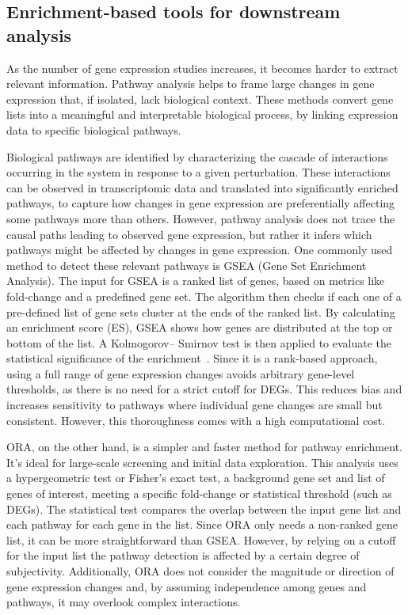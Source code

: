 \subsection{Enrichment-based tools for downstream analysis} %
\label{sub:enrichment_based_tools}

As the number of gene expression studies increases, it becomes harder to extract relevant information. Pathway analysis helps to frame large changes in gene expression that, if isolated, lack biological context. These methods convert gene lists into a meaningful and interpretable biological process, by linking expression data to specific biological pathways.

Biological pathways are identified by characterizing the cascade of interactions occurring in the system in response to a given perturbation. These interactions can be observed in transcriptomic data and translated into significantly enriched pathways, to capture how changes in gene expression are preferentially affecting some pathways more than others. However, pathway analysis does not trace the causal paths leading to observed gene expression, but rather it infers which pathways might be affected by changes in gene expression. One commonly used method to detect these relevant pathways is GSEA (Gene Set Enrichment Analysis). The input for GSEA is a ranked list of genes, based on metrics like fold-change and a predefined gene set. The algorithm then checks if each one of a pre-defined list of gene sets cluster at the ends of the ranked list. By calculating an enrichment score (ES), GSEA shows how genes are distributed at the top or bottom of the list. A Kolmogorov– Smirnov test is then applied to evaluate the statistical significance of the enrichment~\cite{RN152}. Since it is a rank-based approach, using a full range of gene expression changes avoids arbitrary gene-level thresholds, as there is no need for a strict cutoff for DEGs. This reduces bias and increases sensitivity to pathways where individual gene changes are small but consistent. However, this thoroughness comes with a high computational cost. 

\gls{ORA}, on the other hand, is a simpler and faster method for pathway enrichment. It's ideal for large-scale screening and initial data exploration. This analysis uses a hypergeometric test or Fisher's exact test, a background gene set and list of genes of interest, meeting a specific fold-change or statistical threshold (such as DEGs). The statistical test compares the overlap between the input gene list and each pathway for each gene in the list. Since ORA only needs a non-ranked gene list, it can be more straightforward than GSEA. However, by relying on a cutoff for the input list the pathway detection is affected by a certain degree of subjectivity. Additionally, ORA does not consider the magnitude or direction of gene expression changes and, by assuming independence among genes and pathways, it may overlook complex interactions. 

